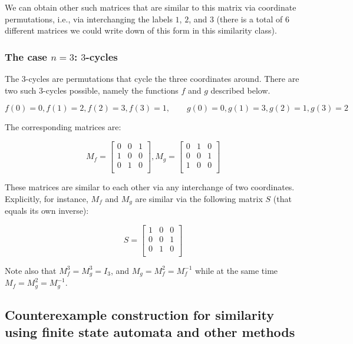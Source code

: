 \documentclass[10pt]{amsart}
\begin{document}
We can obtain other such matrices that are similar to this matrix via
coordinate permutations, i.e., via interchanging the labels $1$, $2$,
and $3$ (there is a total of 6 different matrices we could write down
of this form in this similarity class).

\subsubsection{The case $n = 3$: $3$-cycles}\label{sec:3-cycles}

The 3-cycles are permutations that cycle the three coordinates
around. There are two such 3-cycles possible, namely the functions $f$
and $g$ described below.

$$f(0) = 0, f(1) = 2, f(2) = 3, f(3) = 1, \qquad g(0) = 0, g(1) = 3, g(2) = 1, g(3) = 2$$

The corresponding matrices are:

$$M_f = \left[\begin{matrix} 0 & 0 & 1 \\ 1 & 0 & 0 \\ 0 & 1 & 0 \\\end{matrix}\right], M_g = \left[\begin{matrix} 0 & 1 & 0 \\ 0 & 0 & 1 \\ 1 & 0 & 0 \\\end{matrix}\right]$$

These matrices are similar to each other via any interchange of two
coordinates. Explicitly, for instance, $M_f$ and $M_g$ are similar via
the following matrix $S$ (that equals its own inverse):

$$S = \left[\begin{matrix} 1 & 0 & 0 \\ 0 & 0 & 1 \\ 0 & 1 & 0 \\\end{matrix}\right]$$

Note also that $M_f^3 = M_g^3 = I_3$, and $M_g = M_f^2 = M_f^{-1}$
while at the same time $M_f = M_g^2 = M_g^{-1}$.

\subsection{Counterexample construction for similarity using finite state automata and other methods}\label{sec:using-finite-state-automata}
\end{document}
